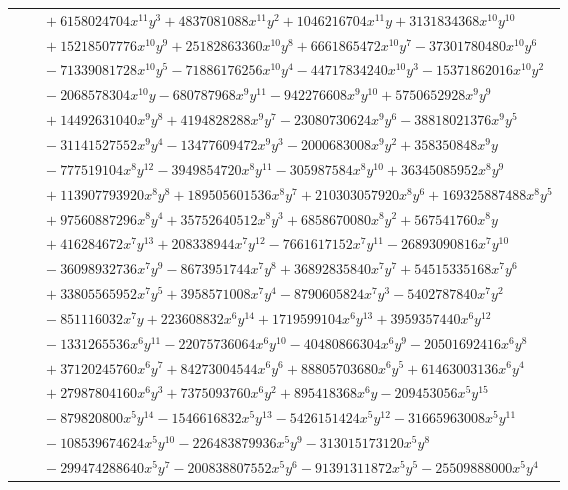 \documentclass[11pt]{article}
\begin{document}
\begin{longtable}{@{}ll@{}}
 & $\quad +6158024704x^{11}y^{3}+4837081088x^{11}y^{2}+1046216704x^{11}y+3131834368x^{10}y^{10}$\\
 & $\quad +15218507776x^{10}y^{9}+25182863360x^{10}y^{8}+6661865472x^{10}y^{7}-37301780480x^{10}y^{6}$\\
 & $\quad -71339081728x^{10}y^{5}-71886176256x^{10}y^{4}-44717834240x^{10}y^{3}-15371862016x^{10}y^{2}$\\
 & $\quad -2068578304x^{10}y-680787968x^{9}y^{11}-942276608x^{9}y^{10}+5750652928x^{9}y^{9}$\\
 & $\quad +14492631040x^{9}y^{8}+4194828288x^{9}y^{7}-23080730624x^{9}y^{6}-38818021376x^{9}y^{5}$\\
 & $\quad -31141527552x^{9}y^{4}-13477609472x^{9}y^{3}-2000683008x^{9}y^{2}+358350848x^{9}y$\\
 & $\quad -777519104x^{8}y^{12}-3949854720x^{8}y^{11}-305987584x^{8}y^{10}+36345085952x^{8}y^{9}$\\
 & $\quad +113907793920x^{8}y^{8}+189505601536x^{8}y^{7}+210303057920x^{8}y^{6}+169325887488x^{8}y^{5}$\\
 & $\quad +97560887296x^{8}y^{4}+35752640512x^{8}y^{3}+6858670080x^{8}y^{2}+567541760x^{8}y$\\
 & $\quad +416284672x^{7}y^{13}+208338944x^{7}y^{12}-7661617152x^{7}y^{11}-26893090816x^{7}y^{10}$\\
 & $\quad -36098932736x^{7}y^{9}-8673951744x^{7}y^{8}+36892835840x^{7}y^{7}+54515335168x^{7}y^{6}$\\
 & $\quad +33805565952x^{7}y^{5}+3958571008x^{7}y^{4}-8790605824x^{7}y^{3}-5402787840x^{7}y^{2}$\\
 & $\quad -851116032x^{7}y+223608832x^{6}y^{14}+1719599104x^{6}y^{13}+3959357440x^{6}y^{12}$\\
 & $\quad -1331265536x^{6}y^{11}-22075736064x^{6}y^{10}-40480866304x^{6}y^{9}-20501692416x^{6}y^{8}$\\
 & $\quad +37120245760x^{6}y^{7}+84273004544x^{6}y^{6}+88805703680x^{6}y^{5}+61463003136x^{6}y^{4}$\\
 & $\quad +27987804160x^{6}y^{3}+7375093760x^{6}y^{2}+895418368x^{6}y-209453056x^{5}y^{15}$\\
 & $\quad -879820800x^{5}y^{14}-1546616832x^{5}y^{13}-5426151424x^{5}y^{12}-31665963008x^{5}y^{11}$\\
 & $\quad -108539674624x^{5}y^{10}-226483879936x^{5}y^{9}-313015173120x^{5}y^{8}$\\
 & $\quad -299474288640x^{5}y^{7}-200838807552x^{5}y^{6}-91391311872x^{5}y^{5}-25509888000x^{5}y^{4}$\\

\end{longtable}
\end{document}
